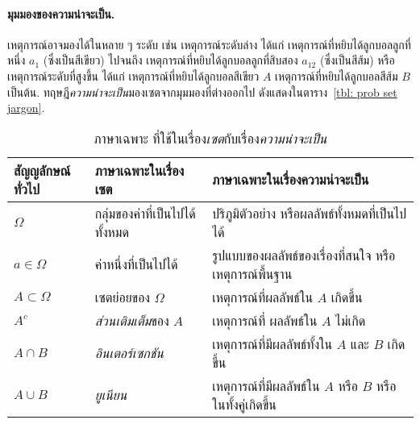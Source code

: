 \paragraph{มุมมองของความน่าจะเป็น.}
เหตุการณ์อาจมองได้ในหลาย ๆ ระดับ เช่น
เหตุการณ์ระดับล่าง ได้แก่
เหตุการณ์ที่หยิบได้ลูกบอลลูกที่หนึ่ง $a_1$ (ซึ่งเป็นสีเขียว)
ไปจนถึง
เหตุการณ์ที่หยิบได้ลูกบอลลูกที่สิบสอง $a_{12}$ (ซึ่งเป็นสีส้ม)
หรือเหตุการณ์ระดับที่สูงขึ้น ได้แก่
เหตุการณ์ที่หยิบได้ลูกบอลสีเขียว $A$
เหตุการณ์ที่หยิบได้ลูกบอลสีส้ม $B$
เป็นต้น.
%
ทฤษฎี\textit{ความน่าจะเป็น}มองเซตจากมุมมองที่ต่างออกไป
ดังแสดงในตาราง~\ref{tbl: prob set jargon}.


\begin{table}[hbtp]
		\caption[ภาษาเรื่องเซตกับเรื่องความน่าจะเป็น]{ภาษาเฉพาะ%
			ที่ใช้ในเรื่อง\textit{เซต}กับเรื่อง\textit{ความน่าจะเป็น}}
		\begin{center}
			\begin{tabular}{lll}
				\hline
				สัญญลักษณ์ทั่วไป  & ภาษาเฉพาะในเรื่องเซต & ภาษาเฉพาะในเรื่องความน่าจะเป็น \\
				\hline
				$\Omega$  & กลุ่มของค่าที่เป็นไปได้ทั้งหมด & ปริภูมิตัวอย่าง  หรือผลลัพธ์ทั้งหมดที่เป็นไปได้\\
				
				$a \in \Omega$  & ค่าหนึ่งที่เป็นไปได้ & รูปแบบของผลลัพธ์ของเรื่องที่สนใจ หรือเหตุการณ์พื้นฐาน \\
				
				$A \subset \Omega$       & เซตย่อยของ $\Omega$ & เหตุการณ์ที่ผลลัพธ์ใน $A$ เกิดขึ้น \\
				
				$A^c$     & \textit{ส่วนเติมเต็ม}ของ $A$ & เหตุการณ์ที่ ผลลัพธ์ใน $A$ ไม่เกิด \\
				
				$A \cap B$ & \textit{อินเตอร์เซกชัน} & เหตุการณ์ที่มีผลลัพธ์ทั้งใน $A$ และ $B$ เกิดขึ้น \\
				
				$A \cup B$ & \textit{ยูเนียน} & เหตุการณ์ที่มีผลลัพธ์ใน $A$ หรือ $B$ หรือในทั้งคู่เกิดขึ้น\\
				

\end{tabular}
\end{center}
\end{table}
